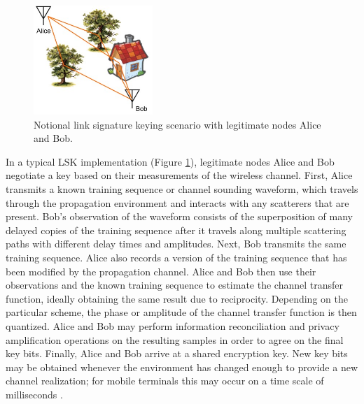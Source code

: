 \documentclass[12pt, titlepage]{article}
\begin{document}
\begin{figure}
\begin{center}
\includegraphics[width=0.4\textwidth]{BasicScenario}
\caption{Notional link signature keying scenario with legitimate nodes Alice and Bob.}\label{scenario}
\end{center}
\end{figure}
In a typical LSK implementation (Figure \ref{scenario}), legitimate nodes Alice and Bob negotiate a key based on their measurements of the wireless channel.  First, Alice transmits a known training sequence or channel sounding waveform, which travels through the propagation environment and interacts with any scatterers that are present.  Bob's observation of the waveform consists of the superposition of many delayed copies of the training sequence after it travels along multiple scattering paths with different delay times and amplitudes. Next, Bob transmits the same training sequence.  Alice also records a version of the training sequence that has been modified by the propagation channel.  Alice and Bob then use their observations and the known training sequence to estimate the channel transfer function, ideally obtaining the same result due to reciprocity.  Depending on the particular scheme, the phase \cite{hershey1995, hassan1996, sayeed2008} or amplitude \cite{azimisadjadi2007, mathur2008, ye2010, premnath2013, jana2013} of the channel transfer function is then quantized.  Alice and Bob may perform information reconciliation and privacy amplification operations on the resulting samples in order to agree on the final key bits.  Finally, Alice and Bob arrive at a shared encryption key.  New key bits may be obtained whenever the environment has changed enough to provide a new channel realization; for mobile terminals this may occur on a time scale of milliseconds \cite{hershey1995}.
 
\end{document}
